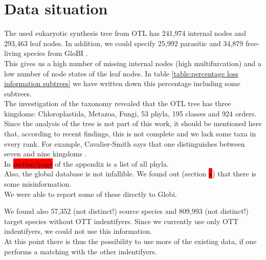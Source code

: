 
  \section{Data situation} \label{sec:discussion - data situation}
    The used eukaryotic synthesis tree from OTL \cite{Hinchliff2015} has 241,974 internal nodes and 
      293,463 leaf nodes. In addition, we could specify 25,992 parasitic and 34,879 free-living 
      species from GloBI \cite{Poelen2014}. \\
    This gives us a high number of missing internal nodes (high multifurcation) and a low number of 
      node states of the leaf nodes. In table \ref{table:percentage loss information subtrees} we have 
      written down this percentage including some subtrees. \\

    The investigation of the taxonomy revealed that the OTL tree has three kingdoms: Chloroplastida, 
      Metazoa, Fungi, 53 phyla, 195 classes and 924 orders. \\
    Since the analysis of the tree is not part of this work, it should be mentioned here that, 
      according to recent findings, this is not complete and we lack some taxa in every rank. For 
      example, Cavalier-Smith says that one distinguishes between seven and nine kingdoms 
      \cite{CavalierSmith1981}. \\
    In \colorbox{red}{section/page} \pageref{subsec:listPhyla} of the appendix is a list of all phyla. \\

    Also, the global database is not infallible. We found out (section \colorbox{red}{x}) that there is some 
      misinformation. \\
    We were able to report some of these directly to Globi.

    We found also 57,352 (not distinct!) source species and 809,993 (not distinct!) target species 
      without OTT indentifyers. Since we currently use only OTT indentifyers, we could not use this information. \\
    At this point there is thus the possibility to use more of the existing data, if one performs a 
      matching with the other indentifyers.

